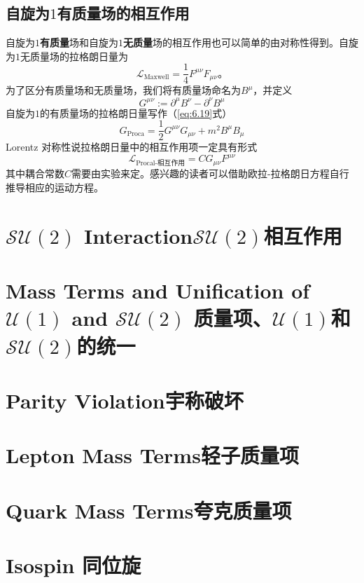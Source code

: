 \subsection{自旋为$1$有质量场的相互作用}\label{sec7.1.8}
自旋为$1${\bf 有质量}场和自旋为$1${\bf 无质量}场的相互作用也可以简单的由对称性得到。自旋为$1$无质量场的拉格朗日量为
\[
{\mathscr L}_\text{Maxwell} = \frac{1}{4}F^{\mu\nu}F_{\mu\nu} \text{。}
\]
为了区分有质量场和无质量场，我们将有质量场命名为$B^\mu$，并定义
\[
G^{\mu\nu} := \partial^\mu B^\nu - \partial^\nu B^\mu
\]
自旋为$1$的有质量场的拉格朗日量写作（\ref{eq:6.19}式）
\[
G_\text{Proca} = \frac{1}{2}G^{\mu\nu}G_{\mu\nu}+m^2 B^\mu B_\mu
\]
Lorentz 对称性说拉格朗日量中的相互作用项一定具有形式
\[
{\mathscr L}_\text{Procal-相互作用}=CG_{\mu\nu}F^{\mu\nu}
\]
其中耦合常数$C$需要由实验来定。感兴趣的读者可以借助欧拉-拉格朗日方程自行推导相应的运动方程。
\section[$\mathcal{SU}(2)$相互作用]{$\mathcal{SU}(2)$ Interaction\quad $\mathcal{SU}(2)$相互作用}\label{sec7.2}

\section[质量项、${\mathcal U}(1)$和$\mathcal{SU}(2)$的统一]{Mass Terms and Unification of ${\mathcal U}(1)$ and $\mathcal{SU}(2)$ \quad 质量项、${\mathcal U}(1)$和$\mathcal{SU}(2)$的统一}\label{sec7.3}

\section[宇称破坏]{Parity Violation\quad 宇称破坏}\label{sec7.4}

\section[轻子质量项]{Lepton Mass Terms\quad 轻子质量项}\label{sec7.5}

\section[夸克质量项]{Quark Mass Terms\quad 夸克质量项}\label{sec7.6}

\section[同位旋]{Isospin \quad 同位旋}\label{sec7.7}

